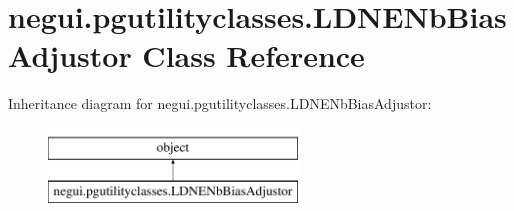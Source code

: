 \hypertarget{classnegui_1_1pgutilityclasses_1_1LDNENbBiasAdjustor}{}\section{negui.\+pgutilityclasses.\+L\+D\+N\+E\+Nb\+Bias\+Adjustor Class Reference}
\label{classnegui_1_1pgutilityclasses_1_1LDNENbBiasAdjustor}
Inheritance diagram for negui.\+pgutilityclasses.\+L\+D\+N\+E\+Nb\+Bias\+Adjustor\+:\begin{figure}[H]
\begin{center}
\leavevmode
\includegraphics[height=2.000000cm]{classnegui_1_1pgutilityclasses_1_1LDNENbBiasAdjustor}
\end{center}
\end{figure}
